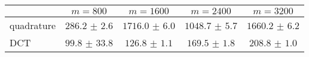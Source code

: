 \centering
\renewcommand{\arraystretch}{1.2}
\begin{tabular}{@{}lcccc@{}}
\toprule
 & $m=800$ & $m=1600$ & $m=2400$ & $m=3200$\\
\midrule
quadrature & $286.2$ $\pm$ $2.6$ & $1716.0$ $\pm$ $6.0$ & $1048.7$ $\pm$ $5.7$ & $1660.2$ $\pm$ $6.2$ \\
DCT & $99.8$ $\pm$ $33.8$ & $126.8$ $\pm$ $1.1$ & $169.5$ $\pm$ $1.8$ & $208.8$ $\pm$ $1.0$ \\
\bottomrule
\end{tabular}
